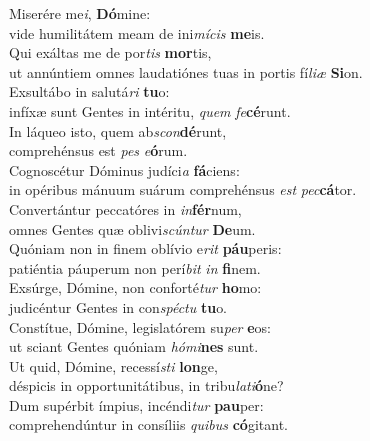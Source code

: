 \oddverse Miserére me\textit{i}, \textbf{Dó}mine:~\*\\
\oddverse vide humilitátem meam de ini\textit{mí}\textit{cis} \textbf{me}is.\\
\evenverse Qui exáltas me de por\textit{tis} \textbf{mor}tis,~\*\\
\evenverse ut annúntiem omnes laudatiónes tuas in portis fí\textit{li}\textit{æ} \textbf{Si}on.\\
\oddverse Exsultábo in salutá\textit{ri} \textbf{tu}o:~\*\\
\oddverse infíxæ sunt Gentes in intéritu, \textit{quem} \textit{fe}\textbf{cé}runt.\\
\evenverse In láqueo isto, quem ab\textit{scon}\textbf{dé}runt,~\*\\
\evenverse comprehénsus est \textit{pes} \textit{e}\textbf{ó}rum.\\
\oddverse Cognoscétur Dóminus judíci\textit{a} \textbf{fá}ciens:~\*\\
\oddverse in opéribus mánuum suárum comprehénsus \textit{est} \textit{pec}\textbf{cá}tor.\\
\evenverse Convertántur peccatóres in \textit{in}\textbf{fér}num,~\*\\
\evenverse omnes Gentes quæ oblivi\textit{scún}\textit{tur} \textbf{De}um.\\
\oddverse Quóniam non in finem oblívio e\textit{rit} \textbf{páu}peris:~\*\\
\oddverse patiéntia páuperum non perí\textit{bit} \textit{in} \textbf{fi}nem.\\
\evenverse Exsúrge, Dómine, non conforté\textit{tur} \textbf{ho}mo:~\*\\
\evenverse judicéntur Gentes in con\textit{spé}\textit{ctu} \textbf{tu}o.\\
\oddverse Constítue, Dómine, legislatórem su\textit{per} \textbf{e}os:~\*\\
\oddverse ut sciant Gentes quóniam \textit{hó}\textit{mi}\textbf{nes} sunt.\\
\evenverse Ut quid, Dómine, recessí\textit{sti} \textbf{lon}ge,~\*\\
\evenverse déspicis in opportunitátibus, in tribu\textit{la}\textit{ti}\textbf{ó}ne?\\
\oddverse Dum supérbit ímpius, incéndi\textit{tur} \textbf{pau}per:~\*\\
\oddverse comprehendúntur in consíliis \textit{qui}\textit{bus} \textbf{có}gitant.\\
